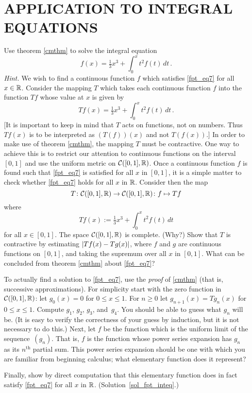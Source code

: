 \section{APPLICATION TO INTEGRAL EQUATIONS}
\begin{exer}\label{fpt_inteq} Use theorem \ref{cmthm} to solve the integral equation
  \begin{equation}\label{fpt_eq7}
        f(x) = \tfrac13 x^3 + \int_0^x t^2 f(t)\,dt\,.
  \end{equation}
\emph{Hint.} We wish to find a continuous function $f$ which satisfies \eqref{fpt_eq7} for all $x
\in \mathbb{R}$.  Consider the mapping $T$ which takes each continuous function $f$ into the function $Tf$
whose value at $x$ is given by
  \[ Tf(x) = \tfrac13 x^3 + \int_0^x t^2 f(t)\,dt\,. \]
[It is important to keep in mind that $T$ acts on functions, not on numbers.  Thus $Tf(x)$ is to be
interpreted as $(T(f))(x)$ and not $T(f(x))$.]  In order to make use of theorem \ref{cmthm}, the
mapping $T$ must be contractive.  One way to achieve this is to restrict our attention to
continuous functions on the interval $[0,1]$ and use the uniform metric on $\mathcal{C}([0,1],\mathbb{R})$.
Once a continuous function $f$ is found such that \eqref{fpt_eq7} is satisfied for all $x$ in
$[0,1]$, it is a simple matter to check whether \eqref{fpt_eq7} holds for all $x$ in $\mathbb{R}$.
Consider then the map
  \[ T \colon \mathcal{C}([0,1],\mathbb{R}) \rightarrow \mathcal{C}([0,1],\mathbb{R}) \colon f \mapsto Tf \]
where
  \[ Tf(x) := \tfrac13 x^3 + \int_0^x t^2 f(t)\,dt \]
for all $x \in [0,1]$.  The space $\mathcal{C}([0,1],\mathbb{R})$ is complete. (Why?)  Show that $T$ is
contractive by estimating $\lvert Tf(x) - Tg(x)\rvert$, where $f$ and $g$ are continuous functions on
$[0,1]$, and taking the supremum over all $x$ in $[0,1]$.  What can be concluded from theorem
\ref{cmthm} about \eqref{fpt_eq7}?

To actually find a solution to \eqref{fpt_eq7}, use the \emph{proof} of \ref{cmthm} (that
is, successive approximations). For simplicity start with the zero function in $\mathcal{C}([0,1],\mathbb{R})$: let $g_0(x) = 0$ for $0 \le x \le 1$.  For $n \ge 0$ let $g_{n+1}(x) =
Tg_n(x)$ for $0 \le x \le 1$. Compute $g_1$, $g_2$, $g_3$, and~$g_4$.  You should be able
to guess what $g_n$ will be. (It is easy to verify the correctness of your guess by
induction, but it is not necessary to do this.) Next, let $f$ be the function which is
the uniform limit of the sequence~$(g_n)$.  That is, $f$ is the function whose power
series expansion has $g_n$ as its $n^{\text{th}}$ partial sum.  This power series
expansion should be one with which you are familiar from beginning calculus; what
elementary function does it represent?

Finally, show by direct computation that this elementary function does in fact satisfy
\eqref{fpt_eq7} for all $x$ in $\mathbb{R}$.   (Solution~\ref{sol_fpt_inteq}.)
\end{exer}


